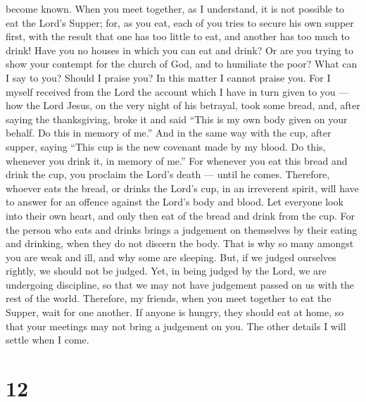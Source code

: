 become known.  When you meet together, as I understand, it
is not possible to eat the Lord's Supper;  for, as you eat,
each of you tries to secure his own supper first, with the result that
one has too little to eat, and another has too much to drink!
 Have you no houses in which you can eat and drink? Or are
you trying to show your contempt for the church of God, and to humiliate
the poor? What can I say to you? Should I praise you? In this matter I
cannot praise you.  For I myself received from the Lord the
account which I have in turn given to you --- how the Lord Jesus, on the
very night of his betrayal, took some bread,  and, after
saying the thanksgiving, broke it and said ``This is my own body given
on your behalf. Do this in memory of me.''  And in the same
way with the cup, after supper, saying ``This cup is the new covenant
made by my blood. Do this, whenever you drink it, in memory of me.''
 For whenever you eat this bread and drink the cup, you
proclaim the Lord's death --- until he comes.  Therefore,
whoever eats the bread, or drinks the Lord's cup, in an irreverent
spirit, will have to answer for an offence against the Lord's body and
blood.  Let everyone look into their own heart, and only
then eat of the bread and drink from the cup.  For the
person who eats and drinks brings a judgement on themselves by their
eating and drinking, when they do not discern the body. 
That is why so many amongst you are weak and ill, and why some are
sleeping.  But, if we judged ourselves rightly, we should
not be judged.  Yet, in being judged by the Lord, we are
undergoing discipline, so that we may not have judgement passed on us
with the rest of the world.  Therefore, my friends, when
you meet together to eat the Supper, wait for one another. 
If anyone is hungry, they should eat at home, so that your meetings may
not bring a judgement on you. The other details I will settle when I
come.

\hypertarget{section-11}{%
\section{12}\label{section-11}}

